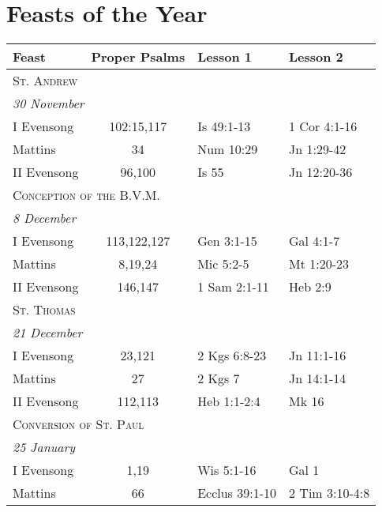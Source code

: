 \section{Feasts of the Year}
\begin{longtable}{l c l l}
\multicolumn{1}{l}{Feast}&\multicolumn{1}{l}{Proper Psalms}&\multicolumn{1}{l}{Lesson 1}& \multicolumn{1}{l}{Lesson 2}\\
\hline
\endhead
\multicolumn{4}{l}{\textsc{St. Andrew}}\\
\multicolumn{4}{l}{\textit{30 November}}\\
\hspace{1em} I Evensong&102:15,117&Is 49:1-13&1 Cor 4:1-16\\
\hspace{1em} Mattins&34&Num 10:29&Jn 1:29-42\\
\hspace{1em} II Evensong&96,100&Is 55&Jn 12:20-36\\
\multicolumn{4}{l}{\textsc{Conception of the B.V.M.}}\\
\multicolumn{4}{l}{\textit{8 December}}\\
\hspace{1em} I Evensong&113,122,127&Gen 3:1-15&Gal 4:1-7\\
\hspace{1em} Mattins&8,19,24&Mic 5:2-5&Mt 1:20-23\\
\hspace{1em} II Evensong&146,147&1 Sam 2:1-11&Heb 2:9\\
\multicolumn{4}{l}{\textsc{St. Thomas}}\\
\multicolumn{4}{l}{\textit{21 December}}\\
\hspace{1em} I Evensong&23,121&2 Kgs 6:8-23&Jn 11:1-16\\
\hspace{1em} Mattins&27&2 Kgs 7&Jn 14:1-14\\
\hspace{1em} II Evensong&112,113&Heb 1:1-2:4&Mk 16\\
\multicolumn{4}{l}{\textsc{Conversion of St. Paul}}\\
\multicolumn{4}{l}{\textit{25 January}}\\
\hspace{1em} I Evensong&1,19&Wis 5:1-16&Gal 1\\
\hspace{1em} Mattins&66&Ecclus 39:1-10&2 Tim 3:10-4:8\\

\end{longtable}
